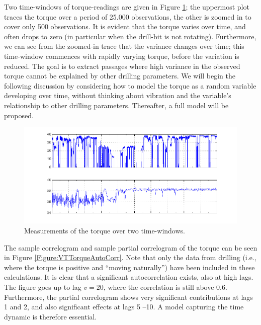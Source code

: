 Two time-windows of torque-readings are given in Figure \ref{Figure:VTTorqueValues}; the uppermost plot traces the torque over a period of 25.000 observations, the other is zoomed in to cover only 500 observations. It is evident that the torque varies over time, and often drops to zero (in particular when the drill-bit is not rotating). Furthermore, we can see from the zoomed-in trace that the variance changes over time; this time-window commences with rapidly varying torque, before the variation is reduced. The goal is to extract passages where high variance in the observed torque cannot be explained by other drilling parameters. 
We will begin the following discussion by considering how to model the torque as a random variable developing over time, without thinking about vibration and the variable's relationship to other drilling parameters. Thereafter, a full model will be proposed.

\begin{figure}[ht!]
\begin{center}
\includegraphics[scale=0.3]{./figures/VT_TRQ_values} 
\caption{\label{Figure:VTTorqueValues} Measurements of the torque over two time-windows.}
\end{center}
\end{figure}

The sample correlogram and sample partial correlogram of the torque can be seen in Figure \ref{Figure:VTTorqueAutoCorr}. Note that only the data from drilling (i.e., where the torque is positive and ``moving naturally'') have been included in these calculations. It is clear that a significant autocorrelation exists, also at high lags. The figure goes up to lag $v=20$, where the correlation is still above $0.6$. Furthermore, the partial correlogram shows very significant contributions at lags 1 and 2, and also significant effects at lags 5 --10. A model capturing the time dynamic is therefore essential. 


